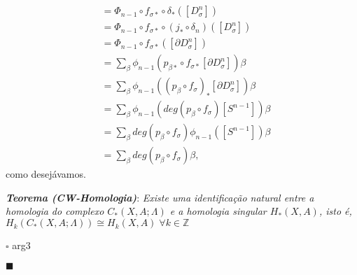 \documentclass[12pt]{book}
\newcommand{\celula}[2]{D^{#1}_{#2}}
\newcommand{\celulafront}[2]{\partial D^{#1}_{#2}}
\newcommand{\homologia}[2]{H_{#1}(#2)}
\newcommand{\homologiarel}[3]{H_{#1}(#2,#3)}
\newcommand{\tese}[3]{\vspace{2mm} \textit{\textbf{#1}}: \textit{#2} \par $\square$ #3 \par $\blacksquare$}
\begin{document}
{$$\begin{aligned}
	\\
	&= \Phi_{n-1}\circ f_{\sigma*}\circ\delta_{*}([\celula{n}{\sigma}])
	\\
	&= \Phi_{n-1}\circ f_{\sigma*}\circ (j_{*}\circ \delta_{n}) ([\celula{n}{\sigma}])
	\\
	&= \Phi_{n-1} \circ f_{\sigma*}([\celulafront{n}{\sigma}])
	\\
	&= \sum_{\beta} \phi_{n-1}(p_{\beta*}\circ f_{\sigma*}[\celulafront{n}{\sigma}])\beta
	\\
	&= \sum_{\beta} \phi_{n-1}((p_{\beta}\circ f_{\sigma})_{*}[\celulafront{n}{\sigma}])\beta
	\\
	&= \sum_{\beta} \phi_{n-1}(deg(p_{\beta}\circ f_{\sigma})[S^{n-1}])\beta
	\\
	&= \sum_{\beta} deg(p_{\beta}\circ f_{\sigma})\phi_{n-1}([S^{n-1}])\beta
	\\
	&= \sum_{\beta} deg(p_{\beta}\circ f_{\sigma})\beta,
	\end{aligned}
	$$
	como desejávamos.}
	
	\tese{Teorema (CW-Homologia)}{Existe uma identificação natural entre a homologia do complexo $C_{*}(X,A; \Lambda)$ e a homologia singular $\homologiarel{*}{X}{A}$, isto é, $\homologia{k}{C_{*}(X,A; \Lambda)} \cong \homologiarel{k}{X}{A}\; \forall k \in \mathbb{Z}$}{arg3}
\end{document}
